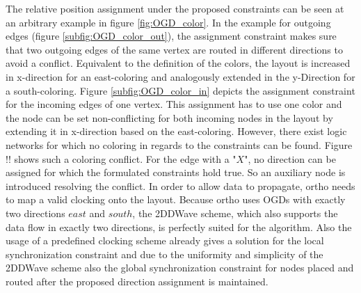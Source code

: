 The relative position assignment under the proposed constraints can be seen at an arbitrary example in figure \ref{fig:OGD_color}. In the example for outgoing edges (figure \ref{subfig:OGD_color_out}), the assignment constraint makes sure that two outgoing edges of the same vertex are routed in different directions to avoid a conflict. Equivalent to the definition of the colors, the layout is increased in x-direction for an east-coloring and analogously extended in the y-Direction for a south-coloring. Figure \ref{subfig:OGD_color_in} depicts the assignment constraint for the incoming edges of one vertex. This assignment has to use one color and the node can be set non-conflicting for both incoming nodes in the layout by extending it in x-direction based on the east-coloring. However, there exist logic networks for which no coloring in regards to the constraints can be found. Figure !! shows such a coloring conflict. For the edge with a "$X$", no direction can be assigned for which the formulated constraints hold true. So an auxiliary node is introduced resolving the conflict.
In order to allow data to propagate, ortho needs to map a valid clocking onto the layout. 
Because ortho uses OGDs with exactly two directions $east$ and $south$, the 2DDWave scheme, which also supports the data flow in exactly two directions, is perfectly suited for the algorithm. Also the usage of a predefined clocking scheme already gives a solution for the local synchronization constraint and due to the uniformity and simplicity of the 2DDWave scheme also the global synchronization constraint for nodes placed and routed after the proposed direction assignment is maintained.\\
